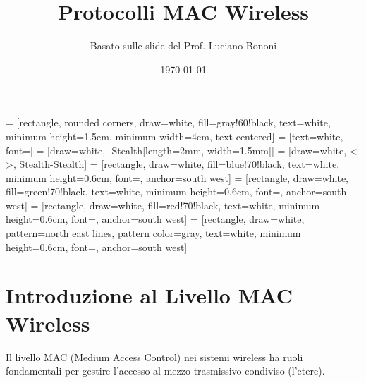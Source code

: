 


 = [rectangle, rounded corners, draw=white, fill=gray!60!black, text=white, minimum height=1.5em, minimum width=4em, text centered]
 = [text=white, font=\footnotesize]
 = [draw=white, -{Stealth[length=2mm, width=1.5mm]}]
 = [draw=white, <->, Stealth-Stealth]
 = [rectangle, draw=white, fill=blue!70!black, text=white, minimum height=0.6cm, font=\tiny, anchor=south west]
 = [rectangle, draw=white, fill=green!70!black, text=white, minimum height=0.6cm, font=\tiny, anchor=south west]
 = [rectangle, draw=white, fill=red!70!black, text=white, minimum height=0.6cm, font=\tiny, anchor=south west]
 = [rectangle, draw=white, pattern=north east lines, pattern color=gray, text=white, minimum height=0.6cm, font=\tiny, anchor=south west]


\title{Protocolli MAC Wireless}
\author{Basato sulle slide del Prof. Luciano Bononi}
\date{\today}



\maketitle
\tableofcontents
\newpage

\section{Introduzione al Livello MAC Wireless}
Il livello MAC (Medium Access Control) nei sistemi wireless ha ruoli fondamentali per gestire l'accesso al mezzo trasmissivo condiviso (l'etere).

